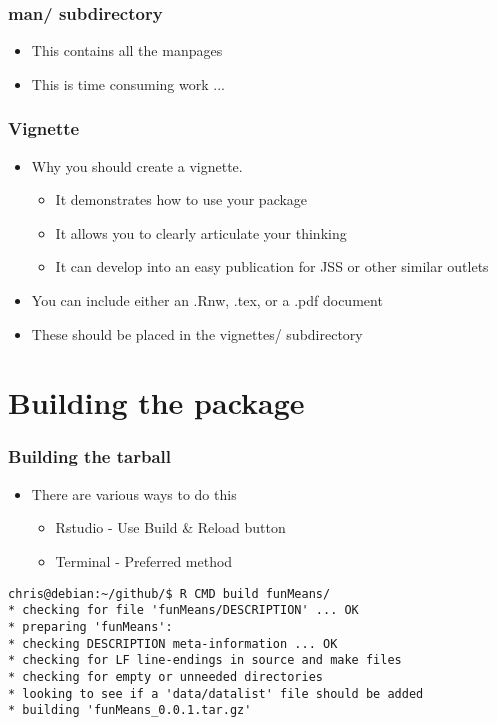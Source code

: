 \documentclass[xcolor=svgnames]{beamer}
\begin{document}
\begin{frame}
  \frametitle{man/ subdirectory}
  \begin{itemize}
  \item This contains all the manpages
  \item This is time consuming work ... 
  \end{itemize}
  
\end{frame}

\begin{frame}
  \frametitle{Vignette}
  \begin{itemize}
  \item Why you should create a vignette.
    \begin{itemize}
    \item It demonstrates how to use your package
    \item It allows you to clearly articulate your thinking
    \item It can develop into an easy publication for JSS or other similar outlets
    \end{itemize}


  \item You can include either an .Rnw, .tex, or a .pdf document
  \item These should be placed in the vignettes/ subdirectory
  \end{itemize}
\end{frame}

\section{Building the package}

\begin{frame}[fragile]
\frametitle{Building the tarball}
   \begin{itemize}
  \item There are various ways to do this
     \begin{itemize}
     \item Rstudio - Use Build \& Reload button
     \item Terminal - Preferred method
     \end{itemize}
  \end{itemize}

  \begin{scriptsize}
  \begin{verbatim}
chris@debian:~/github/$ R CMD build funMeans/
* checking for file 'funMeans/DESCRIPTION' ... OK
* preparing 'funMeans':
* checking DESCRIPTION meta-information ... OK
* checking for LF line-endings in source and make files
* checking for empty or unneeded directories
* looking to see if a 'data/datalist' file should be added
* building 'funMeans_0.0.1.tar.gz'

 \end{verbatim}
\end{scriptsize}
\end{frame}
\end{document}
